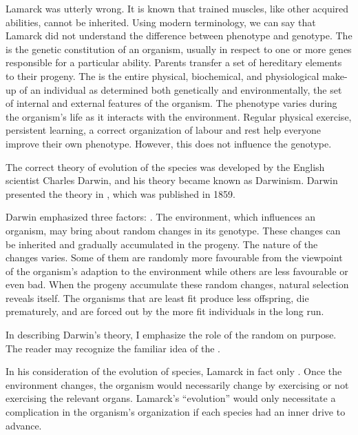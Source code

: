 Lamarck was utterly wrong. It is known that trained muscles, like
other acquired abilities, cannot be inherited. Using modern terminology,
we can say that Lamarck did not understand the difference between
phenotype and genotype. The  is the genetic constitution of an organism, usually in respect to one or more genes responsible for
a particular ability. Parents transfer a set of hereditary elements to their
progeny. The  is the entire physical, biochemical, and physiological make-up of an individual as determined both genetically and
environmentally, the set of internal and external features of the
organism. The phenotype varies during the organism's life as it interacts
with the environment. Regular physical exercise, persistent learning,
a correct organization of labour and rest help everyone improve their
own phenotype. However, this does not influence the genotype.

 The correct theory of evolution of the
species was developed by the English scientist Charles Darwin, and his
theory became known as Darwinism. Darwin presented the theory in
, which was published in 1859.

Darwin emphasized three factors: . The environment, which influences an organism, may bring
about random changes in its genotype. These changes can be inherited
and gradually accumulated in the progeny. The nature of the changes
varies. Some of them are randomly more favourable from the viewpoint
of the organism's adaption to the environment while others are less favourable or even bad. When the progeny accumulate these random
changes, natural selection reveals itself. The organisms that are least fit
produce less offspring, die prematurely, and are forced out by the more
fit individuals in the long run.

In describing Darwin's theory, I emphasize the role of the random on
purpose. The reader may recognize the familiar idea of the .

In his consideration of the evolution of species, Lamarck in fact only
. Once the environment changes, the organism would necessarily change by exercising or not exercising the relevant organs.
Lamarck's ``evolution'' would only necessitate a complication in the
organism's organization if each species had an inner drive to advance.
%

